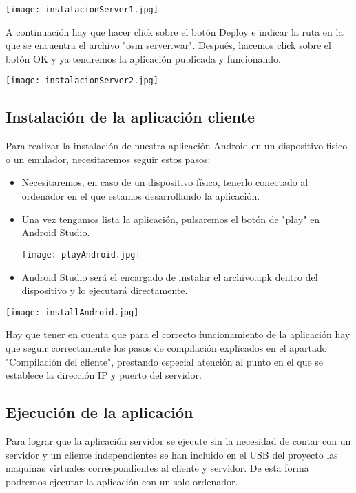 \texttt{[image: instalacionServer1.jpg]}

A continuación hay que hacer click sobre el botón Deploy e indicar la ruta en la que se encuentra el archivo "osm server.war". Después, hacemos click sobre el botón OK y ya tendremos la aplicación publicada y funcionando.

\texttt{[image: instalacionServer2.jpg]}

\subsection{Instalación de la aplicación cliente}

Para realizar la instalación de nuestra aplicación Android en un dispositivo fisico o un emulador, necesitaremos seguir estos pasos:

\begin{itemize}
\item Necesitaremos, en caso de un dispositivo físico, tenerlo conectado al ordenador en el que estamos desarrollando la aplicación.
\item Una vez tengamos lista la aplicación, pulsaremos el botón de "play" en Android Studio.

\texttt{[image: playAndroid.jpg]}

\item Android Studio será el encargado de instalar el archivo.apk dentro del dispositivo y lo ejecutará directamente.
\end{itemize}

\texttt{[image: installAndroid.jpg]}

Hay que tener en cuenta que para el correcto funcionamiento de la aplicación hay que seguir correctamente los pasos de compilación explicados en el apartado "Compilación del cliente", prestando especial atención al punto en el que se establece la dirección IP y puerto del servidor.

\subsection{Ejecución de la aplicación}

Para lograr que la aplicación servidor se ejecute sin la necesidad de contar con un servidor y un cliente independientes se han incluido en el USB del proyecto las maquinas virtuales correspondientes al cliente y servidor. De esta forma podremos ejecutar la aplicación con un solo ordenador.

